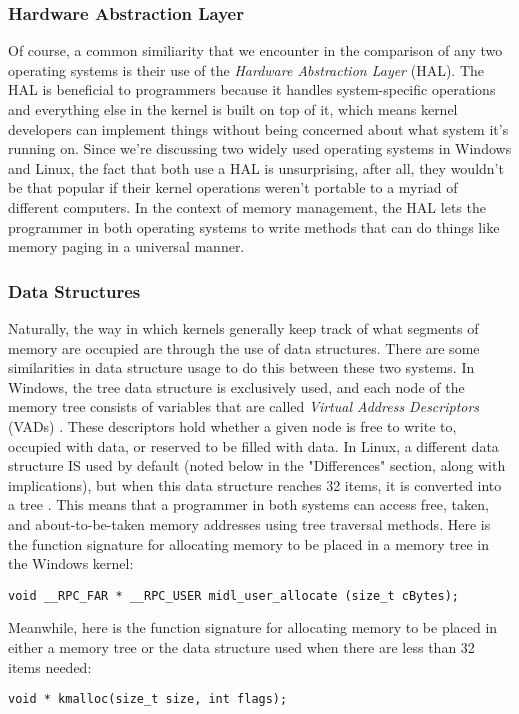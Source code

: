 \documentclass[letterpaper,10pt,titlepage]{article}
\begin{document}
\subsubsection{Hardware Abstraction Layer}
Of course, a common similiarity that we encounter in the comparison of any two operating systems is their use of the \emph{Hardware Abstraction Layer} (HAL). The HAL is beneficial to programmers because it handles system-specific operations and everything else in the kernel is built on top of it, which means kernel developers can implement things without being concerned about what system it's running on. Since we're discussing two widely used operating systems in Windows and Linux, the fact that both use a HAL is unsurprising, after all, they wouldn't be that popular if their kernel operations weren't portable to a myriad of different computers. In the context of memory management, the HAL lets the programmer in both operating systems to write methods that can do things like memory paging in a universal manner. 
\subsubsection{Data Structures}
Naturally, the way in which kernels generally keep track of what segments of memory are occupied are through the use of data structures. There are some similarities in data structure usage to do this between these two systems. In Windows, the tree data structure is exclusively used, and each node of the memory tree consists of variables that are called \emph{Virtual Address Descriptors} (VADs) \cite{windows3}. These descriptors hold whether a given node is free to write to, occupied with data, or reserved to be filled with data. In Linux, a different data structure IS used by default (noted below in the "Differences" section, along with implications), but when this data structure reaches 32 items, it is converted into a tree \cite{linux2}. This means that a programmer in both systems can access free, taken, and about-to-be-taken memory addresses using tree traversal methods.
Here is the function signature for allocating memory to be placed in a memory tree in the Windows kernel: \cite{windows3}
\begin{lstlisting}
void __RPC_FAR * __RPC_USER midl_user_allocate (size_t cBytes);
\end{lstlisting}

Meanwhile, here is the function signature for allocating memory to be placed in either a memory tree or the data structure used when there are less than 32 items needed:
\begin{lstlisting}
void * kmalloc(size_t size, int flags);
\end{lstlisting}
\end{document}
